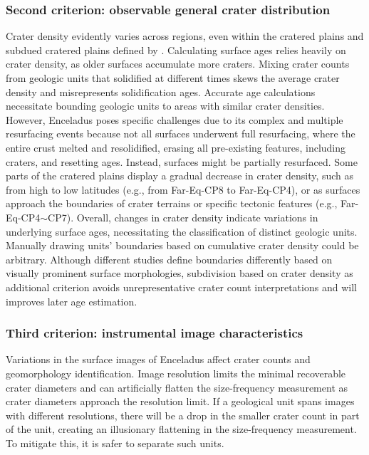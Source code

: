 \documentclass[preprint,11pt,3p,times,authoryear]{elsarticle}
\begin{document}
\subsubsection{Second criterion: observable general crater distribution}
Crater density evidently varies across regions, even within the cratered plains and subdued cratered plains defined by \citet{CrowWillard2015}. Calculating surface ages relies heavily on crater density, as older surfaces accumulate more craters. Mixing crater counts from geologic units that solidified at different times skews the average crater density and misrepresents solidification ages. Accurate age calculations necessitate bounding geologic units to areas with similar crater densities. However, Enceladus poses specific challenges due to its complex and multiple resurfacing events because not all surfaces underwent full resurfacing, where the entire crust melted and resolidified, erasing all pre-existing features, including craters, and resetting ages. Instead, surfaces might be partially resurfaced. Some parts of the cratered plains display a gradual decrease in crater density, such as from high to low latitudes (e.g., from Far-Eq-CP8 to Far-Eq-CP4), or as surfaces approach the boundaries of crater terrains or specific tectonic features (e.g., Far-Eq-CP4$\sim$CP7). Overall, changes in crater density indicate variations in underlying surface ages, necessitating the classification of distinct geologic units.\\

Manually drawing units’ boundaries based on cumulative crater density could be arbitrary. Although different studies define boundaries differently based on visually prominent surface morphologies, subdivision based on crater density as additional criterion avoids unrepresentative crater count interpretations and will improves later age estimation.

\subsubsection{Third criterion: instrumental image characteristics}
Variations in the surface images of Enceladus affect crater counts and geomorphology identification. Image resolution limits the minimal recoverable crater diameters and can artificially flatten the size-frequency measurement as crater diameters approach the resolution limit. If a geological unit spans images with different resolutions, there will be a drop in the smaller crater count in part of the unit, creating an illusionary flattening in the size-frequency measurement. To mitigate this, it is safer to separate such units.\\
\end{document}

